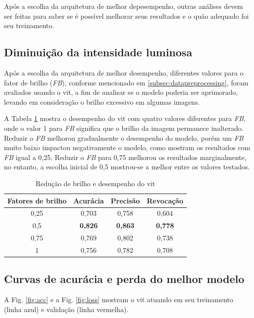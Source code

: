 Após a escolha da arquitetura de melhor depesempenho, outras análises devem ser feitas para saber se é possível melhorar seus resultados e o quão adequado foi seu treinamento.

\subsection{Diminuição da intensidade luminosa}
Após a escolha da arquitetura de melhor desempenho, diferentes valores para o fator de brilho (\textit{FB}), conforme mencionado em \ref{subsec:datapreprocessing}, foram avaliados usando o \acrshort{vit}, a fim de analisar se o modelo poderia ser aprimorado, levando em consideração o brilho excessivo em algumas imagens.

A Tabela \ref{tab:brightnessfactor} mostra o desempenho do \acrshort{vit} com quatro valores diferentes para \textit{FB}, onde o valor 1 para \textit{FB} significa que o brilho da imagem permanece inalterado. Reduzir o \textit{FB} melhorou gradualmente o desempenho do modelo, porém um \textit{FB} muito baixo impactou negativamente o modelo, como mostram os resultados com \textit{FB} igual a 0,25. Reduzir o \textit{FB} para 0,75 melhorou os resultados marginalmente, no entanto, a escolha inicial de 0,5 mostrou-se a melhor entre os valores testados.

\begin{table}[tb]
\caption{\label{tab:brightnessfactor} Redução de brilho e desempenho do \acrshort{vit}}
\begin{center}
\begin{tabular}{c|ccc}
\toprule
 Fatores de brilho & Acurácia &  Precisão  & Revocação \\
\midrule
     0,25 & 0,703 & 0,758 & 0,604 \\
     0,5 & \textbf{0,826} & \textbf{0,863} & \textbf{0,778} \\
     0,75 & 0,769 & 0,802 & 0,738 \\
     1 & 0,756 & 0,782 & 0,708 \\
\bottomrule
\end{tabular}
\end{center}
\end{table}

\subsection{Curvas de acurácia e perda do melhor modelo}
A Fig. \ref{fig:acc} e a Fig. \ref{fig:loss} mostram o \acrshort{vit} atuando em seu treinamento (linha azul) e validação (linha vermelha).

